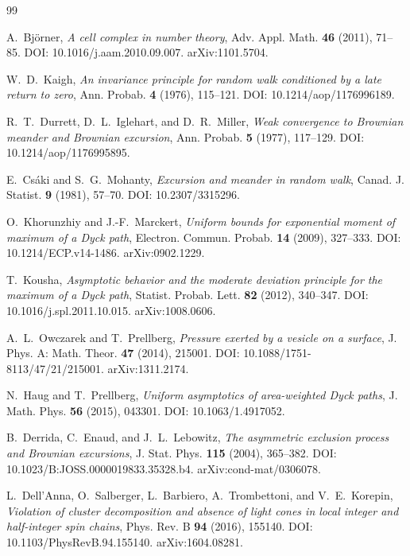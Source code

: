 \documentclass[11pt]{amsart}
\numberwithin{equation}{section}
\theoremstyle{plain}
\theoremstyle{definition}
\theoremstyle{remark}
\begin{document}
\begin{thebibliography}{99}

A.~Bj\"orner,
\emph{A cell complex in number theory},
Adv. Appl. Math. \textbf{46} (2011), 71--85.
DOI: 10.1016/j.aam.2010.09.007.
arXiv:1101.5704.

W.~D.~Kaigh,
\emph{An invariance principle for random walk conditioned by a late return to zero},
Ann. Probab. \textbf{4} (1976), 115--121.
DOI: 10.1214/aop/1176996189.

R.~T.~Durrett, D.~L.~Iglehart, and D.~R.~Miller,
\emph{Weak convergence to Brownian meander and Brownian excursion},
Ann. Probab. \textbf{5} (1977), 117--129.
DOI: 10.1214/aop/1176995895.

E.~Cs\'aki and S.~G.~Mohanty,
\emph{Excursion and meander in random walk},
Canad. J. Statist. \textbf{9} (1981), 57--70.
DOI: 10.2307/3315296.

O.~Khorunzhiy and J.-F.~Marckert,
\emph{Uniform bounds for exponential moment of maximum of a Dyck path},
Electron. Commun. Probab. \textbf{14} (2009), 327--333.
DOI: 10.1214/ECP.v14-1486.
arXiv:0902.1229.

T.~Kousha,
\emph{Asymptotic behavior and the moderate deviation principle for the maximum of a Dyck path},
Statist. Probab. Lett. \textbf{82} (2012), 340--347.
DOI: 10.1016/j.spl.2011.10.015.
arXiv:1008.0606.

A.~L.~Owczarek and T.~Prellberg,
\emph{Pressure exerted by a vesicle on a surface},
J. Phys. A: Math. Theor. \textbf{47} (2014), 215001.
DOI: 10.1088/1751-8113/47/21/215001.
arXiv:1311.2174.

N.~Haug and T.~Prellberg,
\emph{Uniform asymptotics of area-weighted Dyck paths},
J. Math. Phys. \textbf{56} (2015), 043301.
DOI: 10.1063/1.4917052.

B.~Derrida, C.~Enaud, and J.~L.~Lebowitz,
\emph{The asymmetric exclusion process and Brownian excursions},
J. Stat. Phys. \textbf{115} (2004), 365--382.
DOI: 10.1023/B:JOSS.0000019833.35328.b4.
arXiv:cond-mat/0306078.

L.~Dell'Anna, O.~Salberger, L.~Barbiero, A.~Trombettoni, and V.~E.~Korepin,
\emph{Violation of cluster decomposition and absence of light cones in local integer and half-integer spin chains},
Phys. Rev. B \textbf{94} (2016), 155140.
DOI: 10.1103/PhysRevB.94.155140.
arXiv:1604.08281.


\end{thebibliography}
\end{document}
